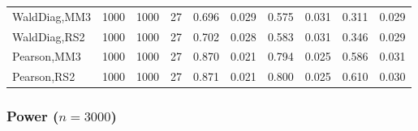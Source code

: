 \documentclass[
]{article}
\begin{document}
\begin{table}[H]
{\begin{tabular}[t]{lrrrrrrlrr}
\hspace{1em}WaldDiag,MM3 & 1000 & 1000 & 27 & 0.696 & 0.029 & 0.575 & 0.031 & 0.311 & 0.029\\
\hspace{1em}WaldDiag,RS2 & 1000 & 1000 & 27 & 0.702 & 0.028 & 0.583 & 0.031 & 0.346 & 0.029\\
\hspace{1em}Pearson,MM3 & 1000 & 1000 & 27 & 0.870 & 0.021 & 0.794 & 0.025 & 0.586 & 0.031\\
\hspace{1em}Pearson,RS2 & 1000 & 1000 & 27 & 0.871 & 0.021 & 0.800 & 0.025 & 0.610 & 0.030\\
\bottomrule
\end{tabular}}
\endgroup{}
\end{table}

\hypertarget{power-n3000-2}{%
\subsubsection{\texorpdfstring{Power
(\(n=3000\))}{Power (n=3000)}}\label{power-n3000-2}}
\end{document}
